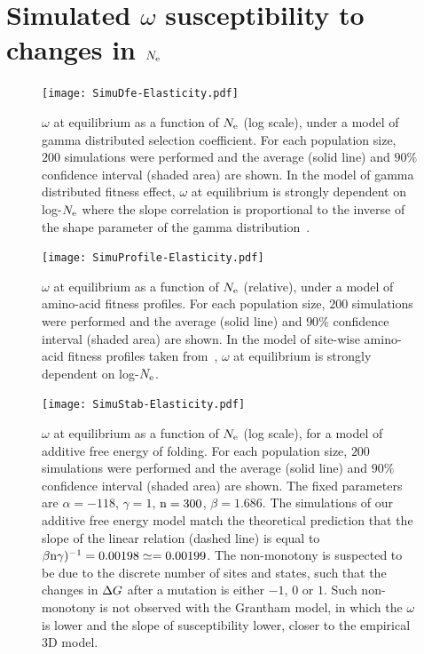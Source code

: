 \section{Simulated \texorpdfstring{$\omega$}{ω} susceptibility to changes in \texorpdfstring{$N_{\mathrm{e}}$}{Nₑ}}

\begin{figure}[H]
	\centering
	\texttt{[image: SimuDfe-Elasticity.pdf]}
	\caption[$\omega$ susceptibility with gamma distributed selection coefficient]{
	$\omega$ at equilibrium as a function of $N_{\mathrm{e}}$ (log scale), under a model of gamma distributed selection coefficient.
	For each population size, $200$ simulations were performed and the average (solid line) and $90\%$ confidence interval (shaded area) are shown.
	In the model of gamma distributed fitness effect, $\omega$ at equilibrium is strongly dependent on log-$N_{\mathrm{e}}$ where the slope correlation is proportional to the inverse of the shape parameter of the gamma distribution~\citep{Welch2008}.
	}
\end{figure}

\begin{figure}[H]
	\centering
	\texttt{[image: SimuProfile-Elasticity.pdf]}
	\caption[$\omega$ susceptibility with amino-acid fitness profiles]{
	$\omega$ at equilibrium as a function of $N_{\mathrm{e}}$ (relative), under a model of amino-acid fitness profiles.
	For each population size, $200$ simulations were performed and the average (solid line) and $90\%$ confidence interval (shaded area) are shown.
	In the model of site-wise amino-acid fitness profiles taken from~\citep{Bloom2017}, $\omega$ at equilibrium is strongly dependent on log-$N_{\mathrm{e}}$.
	}
\end{figure}

\begin{figure}[H]
	\centering
	\texttt{[image: SimuStab-Elasticity.pdf]}
	\caption[$\omega$ susceptibility with additive free energy of folding]{
	$\omega$ at equilibrium as a function of $N_{\mathrm{e}}$ (log scale), for a model of additive free energy of folding.
	For each population size, $200$ simulations were performed and the average (solid line) and $90\%$ confidence interval (shaded area) are shown.
	The fixed parameters are $\alpha=-118$, $\gamma=1$, $\text{n}=300$, $\beta=1.686$.
	The simulations of our additive free energy model match the theoretical prediction that the slope of the linear relation (dashed line) is equal to $\beta \text{n} \gamma)^{-1} = 0.00198 \simeq = 0.00199$.
	The non-monotony is suspected to be due to the discrete number of sites and states, such that the changes in $\Delta G$ after a mutation is either $-1$, $0$ or $1$. Such non-monotony is not observed with the Grantham model, in which the $\omega$ is lower and the slope of susceptibility lower, closer to the empirical 3D model.
	}
\end{figure}

